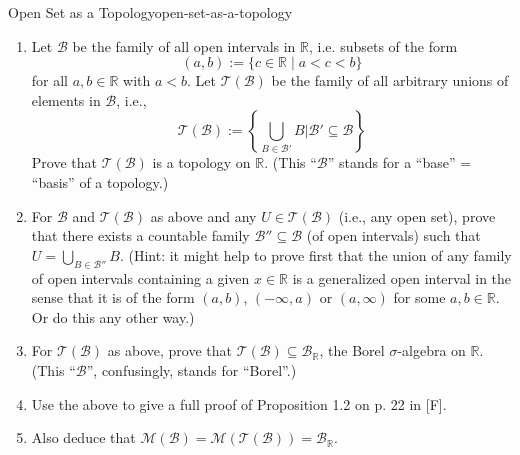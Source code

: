 \begin{mystexercise}{Open Set as a Topology}{open-set-as-a-topology}\label{Open-Set-as-a-Topology}\label{open-set-as-a-topology}\begin{enumerate}
\item Let $\mathcal{B}$ be the family of all open intervals in $\mathbb{R}$, i.e. subsets of the form
\begin{equation}
(a, b) := \{c \in \mathbb{R} \mid a < c < b\}
\end{equation}
for all $a, b \in \mathbb{R}$ with $a < b$. Let $\mathcal{T}(\mathcal{B})$ be the family of all arbitrary unions of elements in $\mathcal{B}$, i.e.,
\begin{equation}
\mathcal{T}(\mathcal{B}) := \left\{ \bigcup_{B \in \mathcal{B}'} B \mathrel{\Big\vert{}} \mathcal{B}' \subseteq \mathcal{B} \right\}
\end{equation}
Prove that $\mathcal{T}(\mathcal{B})$ is a topology on $\mathbb{R}$. (This ``$\mathcal{B}$'' stands for a ``base'' = ``basis'' of a topology.)


\item For $\mathcal{B}$ and $\mathcal{T}(\mathcal{B})$ as above and any $U \in \mathcal{T}(\mathcal{B})$ (i.e., any open set), prove that there exists a countable family $\mathcal{B}'' \subseteq \mathcal{B}$ (of open intervals) such that $U = \bigcup_{B \in \mathcal{B}''} B$. (Hint: it might help to prove first that the union of any family of open intervals containing a given $x \in \mathbb{R}$ is a generalized open interval in the sense that it is of the form $(a, b)$, $( -\infty, a)$ or $(a, \infty)$ for some $a, b \in \mathbb{R}$. Or do this any other way.)
\item For $\mathcal{T}(\mathcal{B})$ as above, prove that $\mathcal{T}(\mathcal{B}) \subseteq \mathcal{B}_{\mathbb{R}}$, the Borel $\sigma$-algebra on $\mathbb{R}$. (This ``$\mathcal{B}$'', confusingly, stands for ``Borel''.)
\item Use the above to give a full proof of Proposition 1.2 on p. 22 in [F].
\item Also deduce that $\mathcal{M}(\mathcal{B}) = \mathcal{M}(\mathcal{T}(\mathcal{B})) = \mathcal{B}_{\mathbb{R}}$.
\end{enumerate}

\end{mystexercise}
